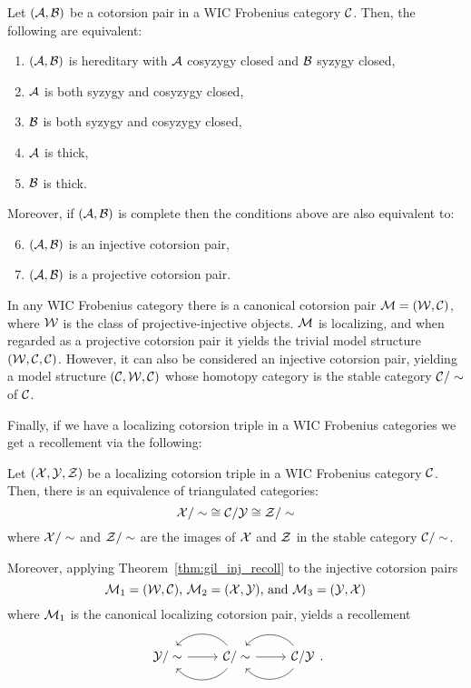 \begin{prop}{ \cite[Proposition 4.2]{G7}}\label{prop:gil_localizing_pair}
  Let $(\mathcal{A},\mathcal{B})$ be a cotorsion pair in a WIC Frobenius category $\mathcal{C}$. Then, the following are equivalent:
  \begin{enumerate}
    \item $(\mathcal{A},\mathcal{B})$ is hereditary with $\mathcal{A}$ cosyzygy closed and $\mathcal{B}$ syzygy closed,
    \item $\mathcal{A}$ is both syzygy and cosyzygy closed,
    \item $\mathcal{B}$ is both syzygy and cosyzygy closed,
    \item $\mathcal{A}$ is thick,
    \item $\mathcal{B}$ is thick.
  \end{enumerate}

  Moreover, if $(\mathcal{A},\mathcal{B})$ is complete then the conditions above are also equivalent to:
  \begin{enumerate}\setcounter{enumi}{5}
    \item $(\mathcal{A},\mathcal{B})$ is an injective cotorsion pair,
    \item $(\mathcal{A},\mathcal{B})$ is a projective cotorsion pair.
  \end{enumerate}
\end{prop}

\begin{rem}
  In any WIC Frobenius category there is a canonical cotorsion pair $\mathcal{M}=(\mathcal{W},\mathcal{C})$, where $\mathcal{W}$ is the class of projective-injective objects. $\mathcal{M}$ is localizing, and when regarded as a projective cotorsion pair it yields the trivial model structure $(\mathcal{W},\mathcal{C},\mathcal{C})$. However, it can also be considered an injective cotorsion pair, yielding a model structure $(\mathcal{C},\mathcal{W},\mathcal{C})$ whose homotopy category is the stable category ${\mathcal{C}/\sim}$ of $\mathcal{C}$.
\end{rem}

Finally, if we have a localizing cotorsion triple in a WIC Frobenius categories we get a recollement via the following:

\begin{cor}{\cite[Corollary~4.5]{G7}}\label{cor:gill_local_recoll}
  Let $(\mathcal{X},\mathcal{Y},\mathcal{Z})$ be a localizing cotorsion triple in a WIC Frobenius category $\mathcal{C}$. Then, there is an equivalence of triangulated categories:
  \[ {\mathcal{X}/\sim} \cong {\mathcal{C}/\mathcal{Y}}  \cong {\mathcal{Z}/\sim} \]
  where $\mathcal{X}/\sim$ and $\mathcal{Z}/\sim$ are the images of $\mathcal{X}$ and $\mathcal{Z}$ in the stable category $\mathcal{C}/\sim$.

  Moreover, applying Theorem~\ref{thm:gil_inj_recoll} to the injective cotorsion pairs
  \[ \mathcal{M}_1=(\mathcal{W},\mathcal{C})\text{, }\mathcal{M}_2=(\mathcal{X},\mathcal{Y})\text{, and }\mathcal{M}_3=(\mathcal{Y},\mathcal{X}) \]
  where $\mathcal{M}_1$ is the canonical localizing cotorsion pair, yields a recollement
  \begin{equation*}
    \recdiagram{\Y/\sim}{\C/\sim}{\C/\Y}.
  \end{equation*}
\end{cor}



